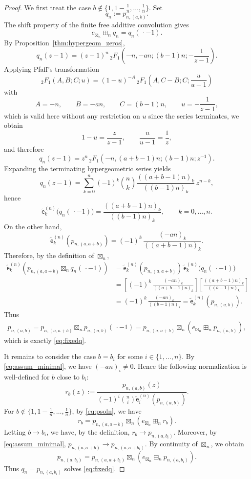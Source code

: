 \documentclass[10pt,a4paper]{amsart}
\newcommand{\coef}[2]{\widetilde{\mathsf{e}}_{#1}^{(#2)}} %
\begin{document}
\begin{proof}
We first treat the case
\(
b\notin\{1,1-\frac1n,\ldots,\frac1n\}.
\)
Set
\[
q_n:=p_{n,(a,b)}.
\]
The shift property of the finite free additive
convolution gives
\[
e_{\boxtimes_n}\boxplus_n q_n = q_n(\,\cdot-1).
\]
By Proposition~\ref{thm:hypergeom_zeros},
\[
q_n(z-1)
=
(z-1)^n\,{}_2F_1\!\left(-n,-an;(b-1)n;-\frac{1}{z-1}\right).
\]
Applying Pfaff's transformation 
\[
{}_2F_1(A,B;C;u)
=
(1-u)^{-A}\,
{}_2F_1\!\left(A,C-B;C;\frac{u}{u-1}\right)
\]
with
\[
A=-n,\qquad B=-an,\qquad C=(b-1)n,\qquad u=-\frac{1}{z-1},
\]
which is valid here without any restriction on \(u\) since the series terminates, we obtain
\[
1-u=\frac{z}{z-1},
\qquad
\frac{u}{u-1}=\frac{1}{z},
\]
and therefore
\[
q_n(z-1)
=
z^n\,{}_2F_1\!\left(-n,(a+b-1)n;(b-1)n;z^{-1}\right).
\]
Expanding the terminating hypergeometric series yields
\[
q_n(z-1)
=
\sum_{k=0}^n
(-1)^k\binom{n}{k}
\frac{((a+b-1)n)_k}{((b-1)n)_k}
\,z^{n-k},
\]
hence
\[
\coef{k}{n}\!\bigl(q_n(\,\cdot-1)\bigr)
=
\frac{((a+b-1)n)_k}{((b-1)n)_k},
\qquad k=0,\ldots,n.
\]
On the other hand,
\[
\coef{k}{n}\!\left(p_{n,(a,a+b)}\right)
=
(-1)^k\,\frac{(-an)_k}{((a+b-1)n)_k}.
\]
Therefore, by the definition of \(\boxtimes_n\),
\begin{align*}
\coef{k}{n}\!\left(p_{n,(a,a+b)}\boxtimes_n q_n(\,\cdot-1)\right)
&=
\coef{k}{n}\!\left(p_{n,(a,a+b)}\right)\,
\coef{k}{n}\!\bigl(q_n(\,\cdot-1)\bigr)\\
&=
\left[(-1)^k\,\frac{(-an)_k}{((a+b-1)n)_k}\right]
\left[\frac{((a+b-1)n)_k}{((b-1)n)_k}\right]\\
&=
(-1)^k\,\frac{(-an)_k}{((b-1)n)_k}
=
\coef{k}{n}\!\left(p_{n,(a,b)}\right).
\end{align*}
Thus
\begin{align}\label{eq:psoln}
p_{n,(a,b)}
=
p_{n,(a,a+b)}\boxtimes_n p_{n,(a,b)}(\,\cdot-1) = p_{n,(a,a+b)}\boxtimes_n (e_{\boxtimes_n}\boxplus_n p_{n,(a,b)}),
\end{align}
which is exactly \eqref{eq:fixedq}.

It remains to consider the case \(b=b_i\) for some \(i\in\{1,\ldots,n\}\).
By \eqref{eq:assum_minimal}, we have \((-an)_i\neq0\). Hence the following
normalization is well-defined for \(b\) close to \(b_i\):
\[
r_b(z):=
\frac{
p_{n,(a,b)}(z)
}{
(-1)^i\binom{n}{i}\coef{i}{n}(p_{n,(a,b)})
}.
\]
For \(b\notin\{1,1-\frac1n,\ldots,\frac1n\}\), by \eqref{eq:psoln}, we have
\[
r_b
=
p_{n,(a,a+b)}\boxtimes_n (e_{\boxtimes_n}\boxplus_n r_b).
\]
Letting \(b\to b_i\), we have, by the definition,
$r_b\to p_{n,(a,b_i)}$.
Moreover, by \eqref{eq:assum_minimal},
$p_{n,(a,a+b)}\to p_{n,(a,a+b_i)}$.
By continuity of \(\boxtimes_n\), we obtain
\[
p_{n,(a,b_i)}
=
p_{n,(a,a+b_i)}
\boxtimes_n (e_{\boxtimes_n}\boxplus_n
p_{n,(a,b_i)}).
\]
Thus \(q_n=p_{n,(a,b_i)}\) solves \eqref{eq:fixedq}.
\end{proof}
\end{document}
